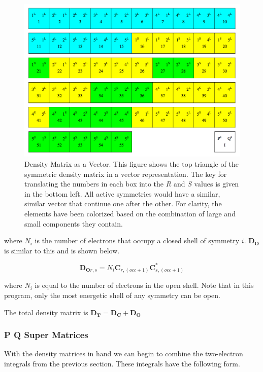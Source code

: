 \documentclass[12pt]{report}
\begin{document}
\begin{figure}
\includegraphics[width=1\textwidth]{Figures/dtmx_vec.png}
\caption[Density Matrix as a Vector]
{Density Matrix as a Vector. This figure shows the top triangle of the symmetric density matrix in a vector representation. The key for translating the numbers in each box into the $R$ and $S$ values is given in the bottom left. All active symmetries would have a similar, similar vector that continue one after the other. For clarity, the elements have been colorized based on the combination of large and small components they contain.}
\label{fig:dtmxvec}
\end{figure}


where $N_{i}$ is the number of electrons that occupy a closed shell of symmetry $i$. \textbf{D$_\textbf{O}$} is similar to this and is shown below.

\begin{equation}
\label{RDOMX}
\textbf{D$_{\textbf{O}r,s}$} =N_{i}\textbf{C}_{r,(occ+1)}\textbf{C}^{*}_{s,(occ+1)}
\end{equation}

where $N_{i}$ is equal to the number of electrons in the open shell. Note that in this program, only the most energetic shell of any symmetry can be open.

The total density matrix is $\textbf{D$_{\textbf{T}}$} =  \textbf{D$_{\textbf{C}}$} + \textbf{D$_{\textbf{O}}$}$

\subsubsection{P Q Super Matrices}
\label{sec:PQmeth}
With the density matrices in hand we can begin to combine the two-electron integrals from the previous section. These integrals have the following form.\cite{MATSUOKA2001218}
\end{document}
